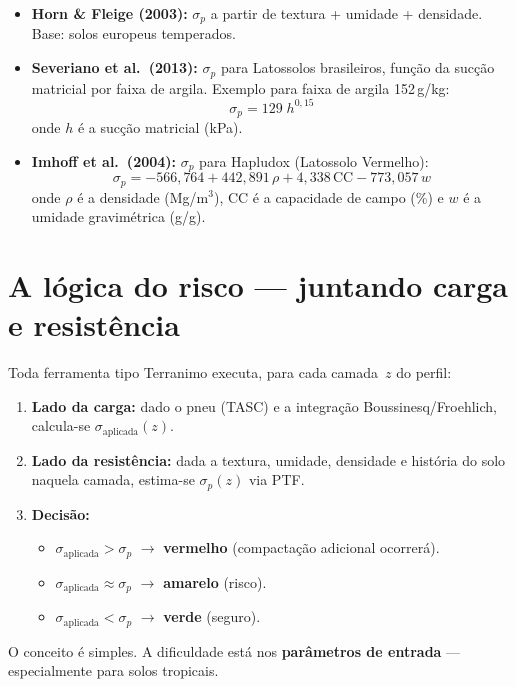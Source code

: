 \documentclass[12pt,a4paper]{article}
\newcommand{\Section}[1]{\needspace{12\baselineskip}\section{#1}}
\begin{document}
\begin{itemize}
  \item \textbf{Horn \& Fleige (2003):} $\sigma_p$ a partir de textura + umidade + densidade. Base: solos europeus temperados.
  \item \textbf{Severiano et al.\ (2013):} $\sigma_p$ para Latossolos brasileiros, função da sucção matricial por faixa de argila. Exemplo para faixa de argila 152\,g/kg:
    \begin{equation}
      \sigma_p = 129\;h^{0{,}15}
    \end{equation}
    onde $h$ é a sucção matricial (kPa).
  \item \textbf{Imhoff et al.\ (2004):} $\sigma_p$ para Hapludox (Latossolo Vermelho):
    \begin{equation}
      \sigma_p = -566{,}764 + 442{,}891\,\rho + 4{,}338\,\text{CC} - 773{,}057\,w
    \end{equation}
    onde $\rho$ é a densidade (Mg/m$^3$), CC é a capacidade de campo (\%) e $w$ é a umidade gravimétrica (g/g).
\end{itemize}

\Section{A lógica do risco --- juntando carga e resistência}

Toda ferramenta tipo Terranimo executa, para cada camada~$z$ do perfil:

\begin{enumerate}
  \item \textbf{Lado da carga:} dado o pneu (TASC) e a integração Boussinesq/Froehlich, calcula-se $\sigma_{\text{aplicada}}(z)$.
  \item \textbf{Lado da resistência:} dada a textura, umidade, densidade e história do solo naquela camada, estima-se $\sigma_p(z)$ via PTF.
  \item \textbf{Decisão:}
    \begin{itemize}
      \item $\sigma_{\text{aplicada}} > \sigma_p$ $\to$ \textbf{vermelho} (compactação adicional ocorrerá).
      \item $\sigma_{\text{aplicada}} \approx \sigma_p$ $\to$ \textbf{amarelo} (risco).
      \item $\sigma_{\text{aplicada}} < \sigma_p$ $\to$ \textbf{verde} (seguro).
    \end{itemize}
\end{enumerate}

O conceito é simples. A dificuldade está nos \textbf{parâmetros de entrada} --- especialmente para solos tropicais.
\end{document}
